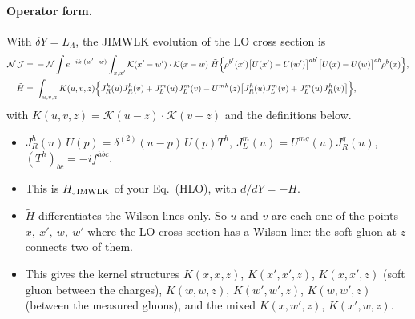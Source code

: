 \documentclass[10pt]{article}
\numberwithin{equation}{section}
\newcommand{\KK}{\mathcal K}
\newcommand{\NN}{\mathcal N}
\newcommand{\LL}{L_\Lambda}
\newcommand{\J}{\mathcal J}
\begin{document}
\paragraph{Operator form.} With $\delta Y=\LL$, the JIMWLK evolution of the LO cross section is
\begin{align}
\NN\,\J={}&-\NN\int e^{-ik\cdot(w'-w)}\int_{x,x'}\KK(x'-w')\cdot\KK(x-w)\;\tilde H\Big\{\rho^{b'}(x')\big[U(x')-U(w')\big]^{ab'}\big[U(x)-U(w)\big]^{ab}\rho^b(x)\Big\},\notag\\
\tilde H={}&\int_{u,v,z}K(u,v,z)\Big\{J_R^h(u)J_R^h(v)+J_L^m(u)J_L^m(v)-U^{mh}(z)\big[J_R^h(u)J_L^m(v)+J_L^m(u)J_R^h(v)\big]\Big\},
\label{eq:Jop}
\end{align}
with $K(u,v,z)=\KK(u-z)\cdot\KK(v-z)$ and the definitions below.
\begin{itemize}
\item $J_R^h(u)\,U(p)=\delta^{(2)}(u-p)\,U(p)T^h$, $J_L^m(u)=U^{mg}(u)J_R^g(u)$, $(T^h)_{bc}=-if^{hbc}$.
\item This is $H_{\rm JIMWLK}$ of your Eq.~(HLO), with $d/dY=-H$.
\item $\tilde H$ differentiates the Wilson lines only. So $u$ and $v$ are each one of the points $x,\ x',\ w,\ w'$ where the LO cross section has a Wilson line: the soft gluon at $z$ connects two of them.
\item This gives the kernel structures $K(x,x,z)$, $K(x',x',z)$, $K(x,x',z)$ (soft gluon between the charges), $K(w,w,z)$, $K(w',w',z)$, $K(w,w',z)$ (between the measured gluons), and the mixed $K(x,w',z)$, $K(x',w,z)$.
\end{itemize}
\end{document}
